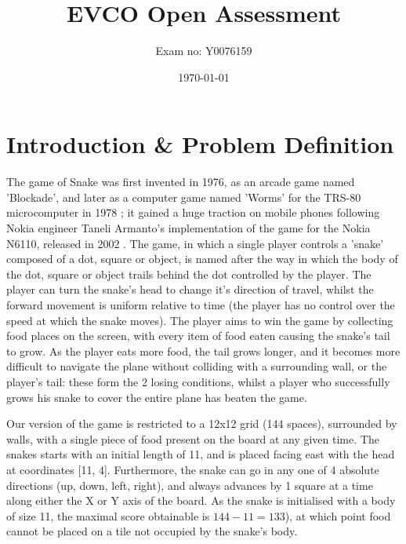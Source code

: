\documentclass[british,10pt,a4paper]{article}
\begin{document}
\title{EVCO Open Assessment}
\author{Exam no: Y0076159}
\date{\today}
\maketitle
\clearpage
\tableofcontents
\clearpage
\listoffigures
\listoftables
\clearpage


\section{Introduction \& Problem Definition}

\begin{minipage}{0.7\textwidth}
The game of Snake was first invented in 1976, as an arcade game named 'Blockade', and later as a computer game named 'Worms' for the TRS-80 microcomputer in 1978 \cite{Goggin2010-ao}; it gained a huge traction on mobile phones following Nokia engineer Taneli Armanto's implementation of the game for the Nokia N6110, released in 2002 \cite{Goggin2010-ao}. The game, in which a single player controls a 'snake' composed of a dot, square or object, is named after the way in which the body of the dot, square or object trails behind the dot controlled by the player. The player can turn the snake's head to change it's direction of travel, whilst the forward movement is uniform relative to time (the player has no control over the speed at which the snake moves). The player aims to win the game by collecting food places on the screen, with every item of food eaten causing the snake's tail to grow. As the player eats more food, the tail grows longer, and it becomes more difficult to navigate the plane without colliding with a surrounding wall, or the player's tail: these form the 2 losing conditions, whilst a player who successfully grows his snake to cover the entire plane has beaten the game.  \newline

Our version of the game is restricted to a 12x12 grid (144 spaces), surrounded by walls, with a single piece of food present on the board at any given time. The snakes starts with an initial length of 11, and is placed facing east with the head at coordinates [11, 4]. Furthermore, the snake can go in any one of 4 absolute directions (up, down, left, right), and always advances by 1 square at a time along either the X or Y axis of the board. As the snake is initialised with a body of size 11, the maximal score obtainable is $144-11=133$), at which point food cannot be placed on a tile not occupied by the snake's body. 
\end{minipage}
\end{document}
